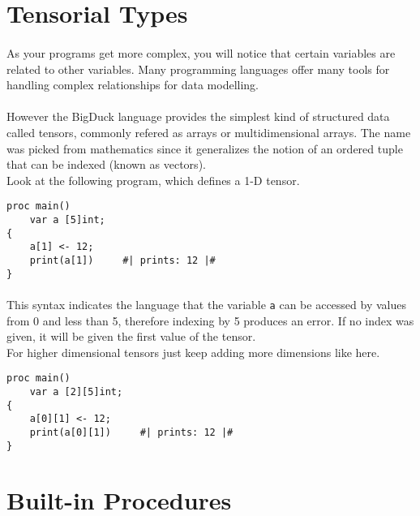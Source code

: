 \newpage

\section{Tensorial Types}

\paragraph{} As your programs get more complex, you will notice that certain
variables are related to other variables. Many programming languages offer
many tools for handling complex relationships for data modelling.

\paragraph{} However the BigDuck language provides the simplest kind of
structured data called tensors, commonly refered as arrays or multidimensional
arrays. The name was picked from mathematics since it generalizes the notion of
an ordered tuple that can be indexed (known as vectors).\\

\noindent
Look at the following program, which defines a 1-D tensor.

\begin{verbatim}
proc main()
    var a [5]int;
{
    a[1] <- 12;
    print(a[1])     #| prints: 12 |#
}
\end{verbatim}

\paragraph{} This syntax indicates the language that the variable \texttt{a}
can be accessed by values from 0 and less than 5, therefore indexing by 5
produces an error. If no index was given, it will be given the first value of
the tensor.\\

\noindent
For higher dimensional tensors just keep adding more dimensions like here.

\begin{verbatim}
proc main()
    var a [2][5]int;
{
    a[0][1] <- 12;
    print(a[0][1])     #| prints: 12 |#
}
\end{verbatim}

\newpage

\section{Built-in Procedures}

